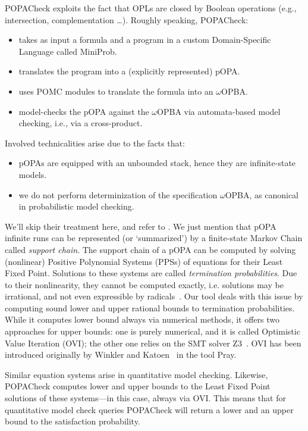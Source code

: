 \documentclass[9pt,a4paper]{article}
\begin{document}
POPACheck exploits the fact that OPLs are closed by Boolean operations (e.g., intersection, complementation \dots).
Roughly speaking, POPACheck:
\begin{itemize}
    \item takes as input a formula and a program in a custom Domain-Specific Language called MiniProb.
    \item translates the program into a (explicitly represented) pOPA.
    \item uses POMC modules to translate the formula into an $\omega$OPBA.
    \item model-checks the pOPA against the $\omega$OPBA via automata-based model checking, i.e., via a cross-product.
\end{itemize}
Involved technicalities arise due to the facts that:
\begin{itemize}
    \item pOPAs are equipped with an unbounded stack, hence they are infinite-state models.
    \item we do not perform determinization of the specification $\omega$OPBA, as canonical in probabilistic model checking.
\end{itemize}
We'll skip their treatment here, and refer to \cite{abs-2404-03515}. We just mention that pOPA infinite runs can be represented (or `summarized') by a finite-state Markov Chain called \emph{support chain}. The support chain of a pOPA can be computed by solving (nonlinear) Positive Polynomial Systems (PPSs) of equations for their Least Fixed Point. Solutions to these systems are called \emph{termination probabilities}. Due to their nonlinearity, they cannot be computed exactly, i.e. solutions may be irrational, and not even expressible by radicals~\cite{EtessamiY09}. Our tool deals with this issue by computing sound lower and upper rational bounds to termination probabilities. While it computes lower bound always via numerical methods, it offers two approaches for upper bounds: one is purely numerical, and it is called Optimistic Value Iteration (OVI); the other one relies on the SMT solver Z3~\cite{z3}. OVI has been introduced originally by Winkler and Katoen~\cite{WinklerK23a} in the tool Pray.

Similar equation systems arise in quantitative model checking.
Likewise, POPACheck computes lower and upper bounds to the Least Fixed Point solutions of these systems---in this case, always via OVI.
This means that for quantitative model check queries POPACheck will return a lower and an upper bound to the satisfaction probability.
\end{document}

